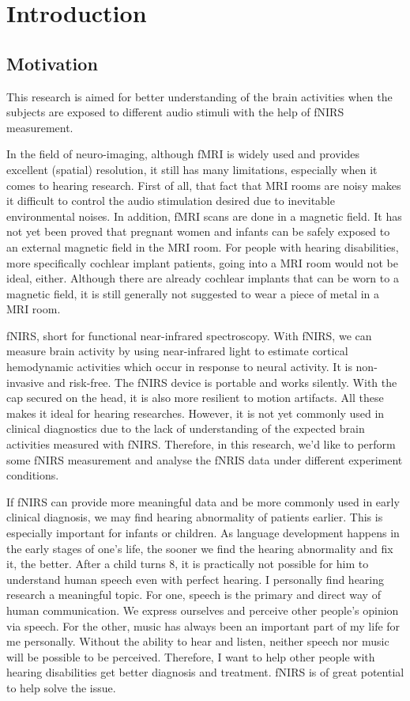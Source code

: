 \chapter{Introduction}

\section{Motivation}
This research is aimed for better understanding of the brain activities when the subjects are exposed to different audio stimuli with the help of fNIRS measurement.

In the field of neuro-imaging, although fMRI is widely used and provides excellent (spatial) resolution, it still has many limitations, especially when it comes to hearing research. First of all, that fact that MRI rooms are noisy makes it difficult to control the audio stimulation desired due to inevitable environmental noises. In addition, fMRI scans are done in a magnetic field. It has not yet been proved that pregnant women and infants can be safely exposed to an external magnetic field in the MRI room. For people with hearing disabilities, more specifically cochlear implant patients, going into a MRI room would not be ideal, either. Although there are already cochlear implants that can be worn to a magnetic field, it is still generally not suggested to wear a piece of metal in a MRI room.

fNIRS,  short for functional near-infrared spectroscopy. With fNIRS, we can measure brain activity by using near-infrared light to estimate cortical hemodynamic activities which occur in response to neural activity. It is non-invasive and risk-free. The fNIRS device is portable and works silently. With the cap secured on the head, it is also more resilient to motion artifacts. All these makes it ideal for hearing researches. However, it is not yet commonly used in clinical diagnostics due to the lack of understanding of the expected brain activities measured with fNIRS. Therefore, in this research, we'd like to perform some fNIRS measurement and analyse the fNRIS data under different experiment conditions.

If fNIRS can provide more meaningful data and be more commonly used in early clinical diagnosis, we may find hearing abnormality of patients earlier. This is especially important for infants or children. As language development happens in the early stages of one's life, the sooner we find the hearing abnormality and fix it, the better. After a child turns 8, it is practically not possible for him to understand human speech even with perfect hearing. I personally find hearing research a meaningful topic. For one, speech is the primary and direct way of human communication. We express ourselves and perceive other people's opinion via speech. For the other, music has always been an important part of my life for me personally. Without the ability to hear and listen, neither speech nor music will be possible to be perceived. Therefore, I want to help other people with hearing disabilities get better diagnosis and treatment. fNIRS is of great potential to help solve the issue.

